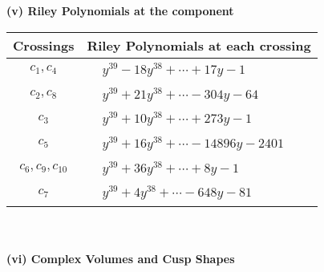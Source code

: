 \documentclass[1p]{elsarticle_modified}
\theoremstyle{definition}
\begin{document}
\newpage\renewcommand{\arraystretch}{1}
\flushleft \textbf{(v) Riley Polynomials at the component}\newline \\
\begin{tabular}{m{50pt}|m{274pt}}
Crossings & \hspace{64pt}Riley Polynomials at each crossing \\
\hline $$\begin{aligned}c_{1},c_{4}\end{aligned}$$&$\begin{aligned}
&y^{39}-18 y^{38}+\cdots+17 y-1
\end{aligned}$\\
\hline $$\begin{aligned}c_{2},c_{8}\end{aligned}$$&$\begin{aligned}
&y^{39}+21 y^{38}+\cdots-304 y-64
\end{aligned}$\\
\hline $$\begin{aligned}c_{3}\end{aligned}$$&$\begin{aligned}
&y^{39}+10 y^{38}+\cdots+273 y-1
\end{aligned}$\\
\hline $$\begin{aligned}c_{5}\end{aligned}$$&$\begin{aligned}
&y^{39}+16 y^{38}+\cdots-14896 y-2401
\end{aligned}$\\
\hline $$\begin{aligned}c_{6},c_{9},c_{10}\end{aligned}$$&$\begin{aligned}
&y^{39}+36 y^{38}+\cdots+8 y-1
\end{aligned}$\\
\hline $$\begin{aligned}c_{7}\end{aligned}$$&$\begin{aligned}
&y^{39}+4 y^{38}+\cdots-648 y-81
\end{aligned}$\\
\hline
\end{tabular}\\~\\
\newpage\flushleft \textbf{(vi) Complex Volumes and Cusp Shapes}
\end{document}

